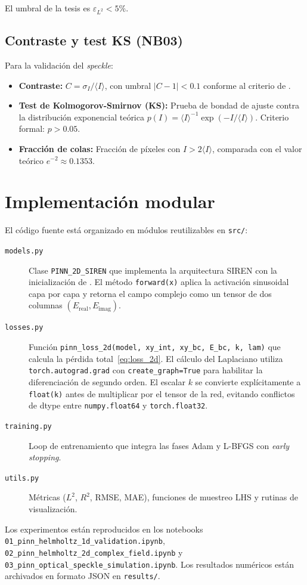 El umbral de la tesis es $\varepsilon_{L^2} < 5\%$.

\subsection{Contraste y test KS (NB03)}

Para la validación del \textit{speckle}:
\begin{itemize}
    \item \textbf{Contraste:} $C = \sigma_I / \langle I \rangle$, con umbral
    $|C - 1| < 0.1$ conforme al criterio de \textcite{goodman2007speckle}.
    \item \textbf{Test de Kolmogorov-Smirnov (KS):} Prueba de bondad de ajuste
    contra la distribución exponencial teórica $p(I) = \langle I \rangle^{-1}
    \exp(-I/\langle I \rangle)$. Criterio formal: $p > 0.05$.
    \item \textbf{Fracción de colas:} Fracción de píxeles con $I > 2\langle I \rangle$,
    comparada con el valor teórico $e^{-2} \approx 0.1353$.
\end{itemize}

\section{Implementación modular}

El código fuente está organizado en módulos reutilizables en \texttt{src/}:

\begin{description}
    \item[\texttt{models.py}] Clase \texttt{PINN\_2D\_SIREN} que implementa
    la arquitectura SIREN con la inicialización de \textcite{sitzmann2020siren}.
    El método \texttt{forward(x)} aplica la activación sinusoidal capa por capa
    y retorna el campo complejo como un tensor de dos columnas
    $(E_\text{real}, E_\text{imag})$.

    \item[\texttt{losses.py}] Función \texttt{pinn\_loss\_2d(model, xy\_int,
    xy\_bc, E\_bc, k, lam)} que calcula la pérdida total~\eqref{eq:loss_2d}.
    El cálculo del Laplaciano utiliza \texttt{torch.autograd.grad} con
    \texttt{create\_graph=True} para habilitar la diferenciación de segundo orden.
    El escalar $k$ se convierte explícitamente a \texttt{float(k)} antes de
    multiplicar por el tensor de la red, evitando conflictos de dtype entre
    \texttt{numpy.float64} y \texttt{torch.float32}.

    \item[\texttt{training.py}] Loop de entrenamiento que integra las fases
    Adam y L-BFGS con \textit{early stopping}.

    \item[\texttt{utils.py}] Métricas ($L^2$, $R^2$, RMSE, MAE), funciones de
    muestreo LHS y rutinas de visualización.
\end{description}

Los experimentos están reproducidos en los notebooks
\texttt{01\_pinn\_helmholtz\_1d\_validation.ipynb},
\texttt{02\_pinn\_helmholtz\_2d\_complex\_field.ipynb} y
\texttt{03\_pinn\_optical\_speckle\_simulation.ipynb}.
Los resultados numéricos están archivados en formato JSON en \texttt{results/}.
